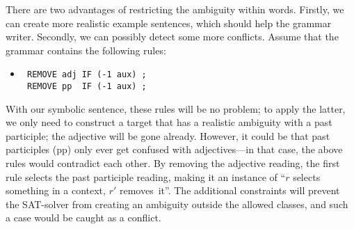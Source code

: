 There are two advantages of restricting the ambiguity within words.
Firstly, we can create more realistic example sentences, which should help the grammar writer.
Secondly, we can possibly detect some more conflicts. Assume that the grammar contains the following rules:

 \begin{itemize}
 \item[] 
\begin{verbatim}
 REMOVE adj IF (-1 aux) ;
 REMOVE pp  IF (-1 aux) ;
 \end{verbatim}
 \end{itemize}

 With our symbolic sentence, these rules will be no problem; to apply the latter, we only need to construct a target that has a realistic ambiguity with a past participle; the adjective will be gone already.
However, it could be that past participles (pp) only ever get confused with adjectives---in that case, the above rules would contradict each other.
 By removing the adjective reading, the first rule selects the past participle reading, making it an instance of ``$r$ selects something in a context, $r'$ removes~it''. 
The additional constraints will prevent the SAT-solver from creating an ambiguity outside the allowed classes, and such a case would be caught as a conflict.





